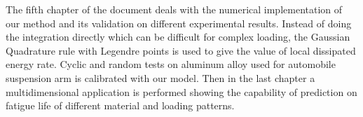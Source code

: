 
The fifth chapter of the document deals with the numerical implementation of our method and its validation on different experimental results. Instead of doing the integration directly which can be difficult for complex loading, the Gaussian
Quadrature rule with Legendre points is used to give the value of local dissipated energy rate. Cyclic and random tests on aluminum alloy used for automobile suspension arm is calibrated with our model. Then in the last chapter a multidimensional  application is performed showing the capability of prediction on fatigue life of different material and loading patterns.
